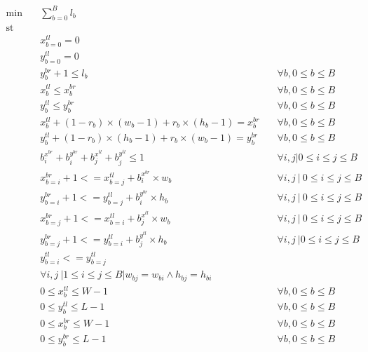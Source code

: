 \documentclass[12pt, a4paper]{article}
\DeclareMathOperator*{\st}{st}
\begin{document}
\begin{subequations}
\begin{align}
  \min \quad & \sum_{b=0}^B l_b \\\label{eq:0}
 \st  \quad & \\
 \quad & x_{b=0}^{tl} = 0 \\\label{c:1}
 \quad & y_{b=0}^{tl} = 0 \\\label{c:2}
 \quad & y_b^{br} + 1 \leq l_b \quad & \forall b, 0 \leq b \leq B \\\label{c:3}
 \quad & x_b^{tl} \leq x_b^{br} \quad & \forall b, 0 \leq b \leq B \\\label{c:4}
 \quad & y_b^{tl} \leq y_b^{br} \quad & \forall b, 0 \leq b \leq B \\\label{c:5}
 \quad & x_b^{tl} + (1-r_b) \times (w_b - 1) + r_b \times (h_b-1) = x_b^{br} \quad & \forall b, 0 \leq b \leq B \\\label{c:6}
 \quad & y_b^{tl} + (1-r_b) \times (h_b - 1) + r_b \times (w_b-1) = y_b^{br} \quad & \forall b, 0 \leq b \leq B \\\label{c:7}
 \quad & b_i^{x^{br}} + b_i^{y^{br}} + b_j^{x^{tl}} + b_j^{y^{tl}} \leq 1 \quad & \forall i,j | 0 \leq i \leq j \leq B \\\label{c:8}
 \quad & x_{b=i}^{br} + 1 <= x_{b=j}^{tl} + b_i^{x^{br}} \times w_b \quad & \forall i,j\ |\ 0 \leq i \leq j \leq B \\\label{c:9}
 \quad & y_{b=i}^{br} + 1 <= y_{b=j}^{tl} + b_i^{y^{br}} \times h_b \quad & \forall i,j\ |\ 0 \leq i \leq j \leq B \\\label{c:10}
 \quad & x_{b=j}^{br} + 1 <= x_{b=i}^{tl} + b_j^{x^{tl}} \times w_b \quad & \forall i,j\ |\ 0 \leq i \leq j \leq B \\\label{c:11}
 \quad & y_{b=j}^{br} + 1 <= y_{b=i}^{tl} + b_j^{y^{tl}} \times h_b \quad & \forall i,j\ | 0 \leq i \leq j \leq B \\\label{c:12}
 \quad & y_{b=i}^{tl} <= y_{b=j}^{tl} \\\quad & \forall i,j\ | 1 \leq i \leq j \leq B | w_{bj} = w_{bi} \land h_{bj} = h_{bi} \\\label{c:13}
 \quad & 0 \leq x_b^{tl} \leq W-1 \quad & \forall b, 0 \leq b \leq B \\\label{b:1}
 \quad & 0 \leq y_b^{tl} \leq L-1 \quad & \forall b, 0 \leq b \leq B \\\label{b:2}
 \quad & 0 \leq x_b^{br} \leq W-1 \quad & \forall b, 0 \leq b \leq B \\\label{b:3}
 \quad & 0 \leq y_b^{br} \leq L-1 \quad & \forall b, 0 \leq b \leq B \\\label{b:4}

\end{align}
\end{subequations}
\end{document}
